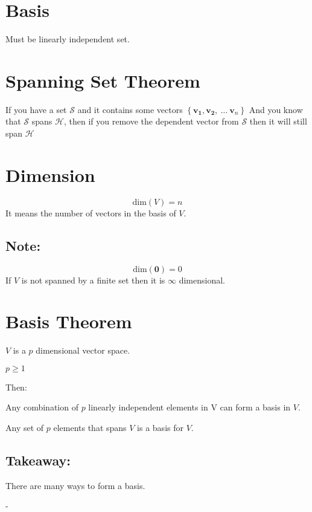 \documentclass{article}
\author{Alex Hiller}
\title{}
\begin{document}
\section{Basis} 
Must be linearly independent set.

\section{Spanning Set Theorem} 
If you have a set $ \mathcal{S} $ and it contains some vectors $ \left\{
\mathbf{v_1}, \mathbf{v_2} , \ \ldots \ \mathbf{v}_{n}  \right\} $
And you know that $ \mathcal{S}  $ spans $ \mathcal{H}  $, then if you remove
the dependent vector from $ \mathcal{S}  $ then it will still span $ \mathcal{H}  $ 

\section{Dimension} 
\[%
    \text{dim}(V) = n
\]%
It means the number of vectors in the basis of $ V $.

\subsection{Note:} 
\[%
    \text{dim}(\mathbf{0}) = 0
\]%
If $ V $ is not spanned by a finite set then it is $ \infty  $ dimensional.

\section{Basis Theorem} 
$ V $ is a $ p $ dimensional vector space. 

$ p \ge 1 $ 

Then:

Any combination of $ p $ linearly independent elements in V can form a basis in
$ V $.

Any set of $ p $ elements that spans $ V $ is a basis for $ V $.

\subsection{Takeaway:} 
There are many ways to form a basis.









\clearpage
-
\end{document}
